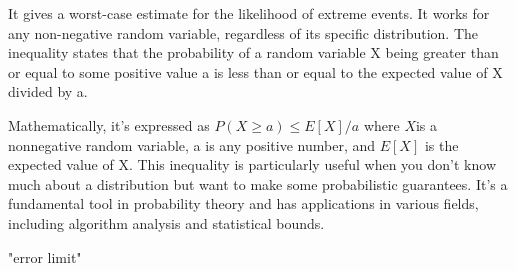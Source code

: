 It gives a worst-case estimate for the likelihood of extreme events.
It works for any non-negative random variable, regardless of its specific distribution.
The inequality states that the probability of a random variable X being greater than or equal to some positive value a is less than or equal to the expected value of X divided by a.

Mathematically, it's expressed as  $P(X \geq a) \leq E[X] / a$ where $X $is a nonnegative random variable, a is any positive number, and $E[X]$ is the expected value of X.
This inequality is particularly useful when you don't know much about a distribution but want to make some probabilistic guarantees. It's a fundamental tool in probability theory and has applications in various fields, including algorithm analysis and statistical bounds.

"error limit"